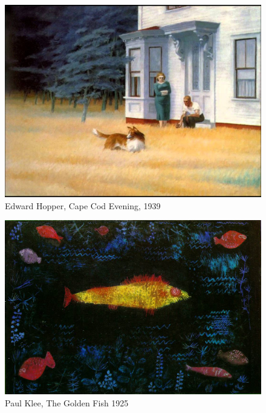 \begin{figure}[h]
	\centering
	\includegraphics[width=12cm]{inspire/CapeCod.jpg}
	\caption{Edward Hopper, Cape Cod Evening, 1939}
	\label{fig:CapeCod}
\end{figure}




\begin{figure}[h]
	\centering
	\includegraphics[width=12cm]{inspire/the-goldfish-1925.jpg}
	\caption{Paul Klee, The Golden Fish 1925}
	\label{fig:GoldenFish}
\end{figure}


